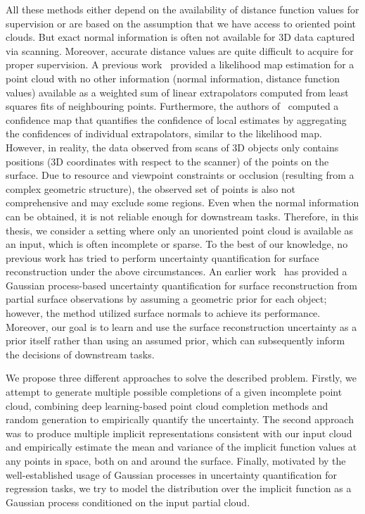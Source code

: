 All these methods either depend on the availability of distance function values for supervision or are based on the assumption that we have access to oriented point clouds. But exact normal information is often not available for 3D data captured via scanning. Moreover, accurate distance values are quite difficult to acquire for proper supervision. A previous work~\cite{UncPCS} provided a likelihood map estimation for a point cloud with no other information (normal information, distance function values) available as a weighted sum of linear extrapolators computed from least squares fits of neighbouring points. Furthermore, the authors of~\cite{UncPCS} computed a confidence map that quantifies the confidence of local estimates by aggregating the confidences of individual extrapolators, similar to the likelihood map. 
\\
However, in reality, the data observed from scans of 3D objects only contains positions (3D coordinates with respect to the scanner) of the points on the surface. Due to resource and viewpoint constraints or occlusion (resulting from a complex geometric structure), the observed set of points is also not comprehensive and may exclude some regions. Even when the normal information can be obtained, it is not reliable enough for downstream tasks. Therefore, in this thesis, we consider a setting where only an unoriented point cloud is available as an input, which is often incomplete or sparse. To the best of our knowledge, no previous work has tried to perform uncertainty quantification for surface reconstruction under the above circumstances. An earlier work~\cite{geoPriorGPIS} has provided a Gaussian process-based uncertainty quantification for surface reconstruction from partial surface observations by assuming a geometric prior for each object; however, the method utilized surface normals to achieve its performance. Moreover, our goal is to learn and use the surface reconstruction uncertainty as a prior itself rather than using an assumed prior, which can subsequently inform the decisions of downstream tasks.
\newline

We propose three different approaches to solve the described problem. Firstly, we attempt to generate multiple possible completions of a given incomplete point cloud, combining deep learning-based point cloud completion methods and random generation to empirically quantify the uncertainty. The second approach was to produce multiple implicit representations consistent with our input cloud and empirically estimate the mean and variance of the implicit function values at any points in space, both on and around the surface. Finally, motivated by the well-established usage of Gaussian processes in uncertainty quantification for regression tasks, we try to model the distribution over the implicit function as a Gaussian process conditioned on the input partial cloud. 
\newline

